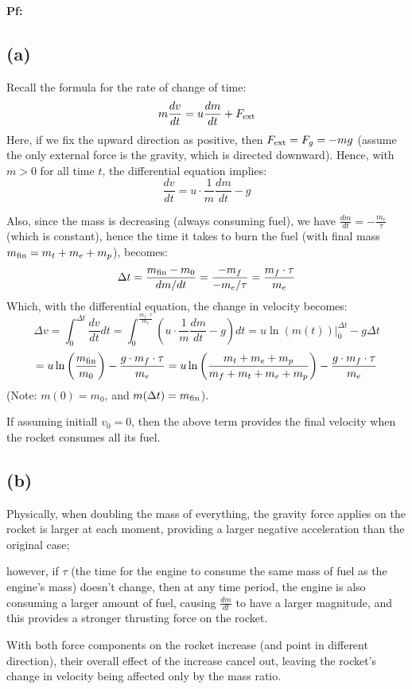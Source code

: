 \documentclass{article}
\begin{document}
\textbf{Pf:}
\subsection*{(a)}
Recall the formula for the rate of change of time:
$$m\frac{dv}{dt}=u\frac{dm}{dt}+F_{\textmd{ext}}$$
Here, if we fix the upward direction as positive, then $F_{\textmd{ext}} = F_g = -mg$ (assume the only external force is the gravity, which is directed downward). Hence, with $m>0$ for all time $t$, the differential equation implies:
$$\frac{dv}{dt}=u\cdot\frac{1}{m}\frac{dm}{dt}-g$$

Also, since the mass is decreasing (always consuming fuel), we have $\frac{dm}{dt}=-\frac{m_e}{\tau}$ (which is constant), hence the time it takes to burn the fuel (with final mass $m_{\textmd{fin}} = m_t+m_e+m_p$), becomes:
$$\Delta t = \frac{m_{\textmd{fin}}-m_0}{dm/dt} = \frac{-m_f}{-m_e/\tau} = \frac{m_f\cdot \tau}{m_e}$$
Which, with the differential equation, the change in velocity becomes:
$$\Delta v=\int_0^{\Delta t}\frac{dv}{dt}dt = \int_0^{\frac{m_f\cdot \tau}{m_e}}\left(u\cdot\frac{1}{m}\frac{dm}{dt}-g\right)dt = u\ln(m(t))\bigg|_0^{\Delta t}-g\Delta t$$
$$=u\ln\left(\frac{m_{\textmd{fin}}}{m_0}\right)-\frac{g\cdot m_f\cdot \tau}{m_e} = u\ln\left(\frac{m_t+m_e+m_p}{m_f+m_t+m_e+m_p}\right)-\frac{g\cdot m_f\cdot \tau}{m_e}$$
(Note: $m(0) = m_0$, and $m(\Delta t)= m_\textmd{fin}$).

If assuming initiall $v_0=0$, then the above term provides the final velocity when the rocket consumes all its fuel.

\subsection*{(b)} 
Physically, when doubling the mass of everything, the gravity force applies on the rocket is larger at each moment, providing a larger negative acceleration than the original case; 

however, if $\tau$ (the time for the engine to consume the same mass of fuel as the engine's mass) doesn't change, then at any time period, the engine is also consuming a larger amount of fuel, causing $\frac{dm}{dt}$ to have a larger magnitude, and this provides a stronger thrusting force on the rocket. 

With both force components on the rocket increase (and point in different direction), their overall effect of the increase cancel out, leaving the rocket's change in velocity being affected only by the mass ratio.
\end{document}
